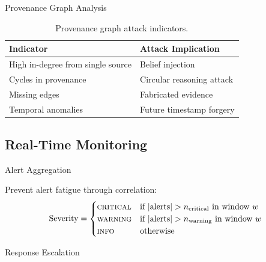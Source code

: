 \documentclass[
  ignorenonframetext,
]{beamer}
\begin{document}
\begin{frame}[allowframebreaks]{Provenance Graph Analysis}
\begin{table}[htbp]
\centering
\caption{Provenance graph attack indicators.}
\label{tab:provenance-indicators}
\begin{tabular}{@{}lp{6cm}@{}}
\toprule
Indicator & Attack Implication \\
\midrule
High in-degree from single source & Belief injection \\
Cycles in provenance & Circular reasoning attack \\
Missing edges & Fabricated evidence \\
Temporal anomalies & Future timestamp forgery \\
\bottomrule
\end{tabular}
\end{table}
\end{frame}

\subsection{Real-Time Monitoring}\label{sec:monitoring}

\begin{frame}[allowframebreaks]{Alert Aggregation}
\protect{}\label{alert-aggregation}
\begin{definition}
\label{def:alert-aggregation}
Prevent alert fatigue through correlation:
\begin{equation}
\label{eq:alert-aggregation}
\text{Severity} = \begin{cases}
\textsc{critical} & \text{if } |\text{alerts}| > n_{\text{critical}} \text{ in window } w \\
\textsc{warning} & \text{if } |\text{alerts}| > n_{\text{warning}} \text{ in window } w \\
\textsc{info} & \text{otherwise}
\end{cases}
\end{equation}
\end{definition}
\end{frame}

\begin{frame}[allowframebreaks]{Response Escalation}
\protect{}\label{response-escalation}
\end{frame}
\end{document}
